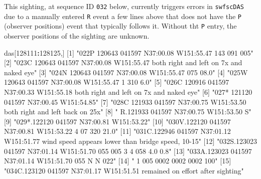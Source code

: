 \documentclass[
]{book}
\newenvironment{Shaded}{\begin{snugshade}}{\end{snugshade}}
\newcommand{\DecValTok}[1]{\textcolor[rgb]{0.00,0.00,0.81}{#1}}
\newcommand{\NormalTok}[1]{#1}
\newcommand{\SpecialCharTok}[1]{\textcolor[rgb]{0.81,0.36,0.00}{\textbf{#1}}}
\newcommand{\StringTok}[1]{\textcolor[rgb]{0.31,0.60,0.02}{#1}}
\begin{document}
This sighting, at sequence ID \texttt{032} below, currently triggers errors in \texttt{swfscDAS} due to a manually entered \texttt{R} event a few lines above that does not have the \texttt{P} (observer positions) event that typically follows it. Without tht \texttt{P} entry, the observer positions of the sighting are unknown.

\begin{Shaded}
\begin{Highlighting}[]
\NormalTok{das[}\DecValTok{128111}\SpecialCharTok{:}\DecValTok{128125}\NormalTok{,] }
\NormalTok{ [}\DecValTok{1}\NormalTok{] }\StringTok{"022P 120643 041597 N37:00.08 W151:55.47  143  091  005"}                                   
\NormalTok{ [}\DecValTok{2}\NormalTok{] }\StringTok{"023C 120643 041597 N37:00.08 W151:55.47 both right and left on 7x and naked eye"}          
\NormalTok{ [}\DecValTok{3}\NormalTok{] }\StringTok{"024N 120643 041597 N37:00.08 W151:55.47  075 08.0"}                                        
\NormalTok{ [}\DecValTok{4}\NormalTok{] }\StringTok{"025W 120643 041597 N37:00.08 W151:55.47    1            310  6.0"}                         
\NormalTok{ [}\DecValTok{5}\NormalTok{] }\StringTok{"026C 120916 041597 N37:00.33 W151:55.18 both right and left on 7x and naked eye"}          
\NormalTok{ [}\DecValTok{6}\NormalTok{] }\StringTok{"027* 121120 041597 N37:00.45 W151:54.85"}                                                  
\NormalTok{ [}\DecValTok{7}\NormalTok{] }\StringTok{"028C 121933 041597 N37:00.75 W151:53.50 both right and left back on 25x"}                  
\NormalTok{ [}\DecValTok{8}\NormalTok{] }\StringTok{"   R.121933 041597 N37:00.75 W151:53.50    S"}                                             
\NormalTok{ [}\DecValTok{9}\NormalTok{] }\StringTok{"029*.122120 041597 N37:00.81 W151:53.22"}                                                  
\NormalTok{[}\DecValTok{10}\NormalTok{] }\StringTok{"030V.122120 041597 N37:00.81 W151:53.22    4   07  320      21.0"}                         
\NormalTok{[}\DecValTok{11}\NormalTok{] }\StringTok{"031C.122946 041597 N37:01.12 W151:51.77 wind speed appears lower than bridge speed, 10{-}15"}
\NormalTok{[}\DecValTok{12}\NormalTok{] }\StringTok{"032S.123023 041597 N37:01.14 W151:51.70  055  005    3    4  058  4.0  0.8"}               
\NormalTok{[}\DecValTok{13}\NormalTok{] }\StringTok{"033A.123023 041597 N37:01.14 W151:51.70  055         N    N  022"}                         
\NormalTok{[}\DecValTok{14}\NormalTok{] }\StringTok{"   1                                     005 0002 0002 0002  100"}                         
\NormalTok{[}\DecValTok{15}\NormalTok{] }\StringTok{"034C.123120 041597 N37:01.17 W151:51.51  remained on effort after sighting"}               
\end{Highlighting}
\end{Shaded}
\end{document}
